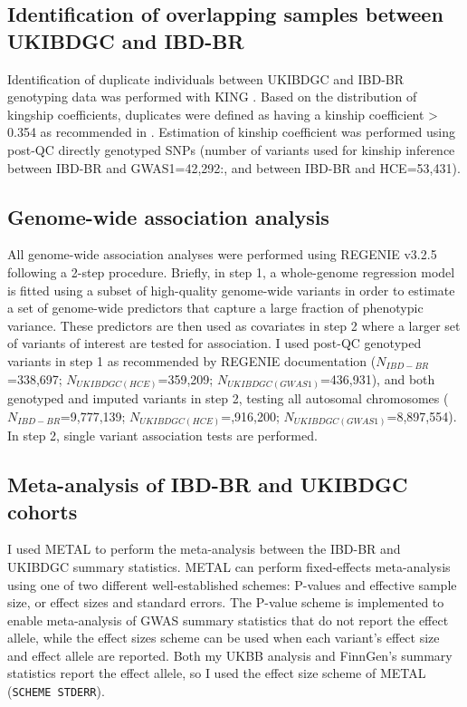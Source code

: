\subsection{Identification of overlapping samples between UKIBDGC and IBD-BR}
Identification of duplicate individuals between UKIBDGC and IBD-BR genotyping data was performed with KING \cite{king-software}. Based on the distribution of kingship coefficients, duplicates were defined as having a kinship coefficient > 0.354 as recommended in \cite{king-software}. Estimation of kinship coefficient was performed using post-QC directly genotyped SNPs (number of variants used for kinship inference between IBD-BR and GWAS1=42,292:, and between IBD-BR and HCE=53,431).

\subsection{Genome-wide association analysis}
All genome-wide association analyses were performed using REGENIE v3.2.5 \cite{Mbatchou2021-qm} following a 2-step procedure. Briefly, in step 1, a whole-genome regression model is fitted using a subset of high-quality genome-wide variants in order to estimate a set of genome-wide predictors that capture a large fraction of phenotypic variance. These predictors are then used as covariates in step 2 where a larger set of variants of interest are tested for association.
I used post-QC genotyped variants in step 1 as recommended by REGENIE documentation ($N_{IBD-BR}$=338,697; $N_{UKIBDGC(HCE)}$=359,209; $N_{UKIBDGC(GWAS1)}$=436,931), and both genotyped and imputed variants in step 2, testing all autosomal chromosomes ($N_{IBD-BR}$=9,777,139; $N_{UKIBDGC(HCE)}$=,916,200; $N_{UKIBDGC(GWAS1)}$=8,897,554). In step 2, single variant association tests are performed.

\subsection{Meta-analysis of IBD-BR and UKIBDGC cohorts}
I used METAL to perform the meta-analysis between the IBD-BR and UKIBDGC summary statistics.  METAL can perform fixed-effects meta-analysis using one of two different well-established schemes: P-values and effective sample size, or effect sizes and standard errors. The P-value scheme is implemented to enable meta-analysis of GWAS summary statistics that do not report the effect allele, while the effect sizes scheme can be used when each variant's effect size and effect allele are reported. Both my UKBB analysis and FinnGen's summary statistics report the effect allele, so I used the effect size scheme of METAL (\Verb+SCHEME STDERR+). \\

